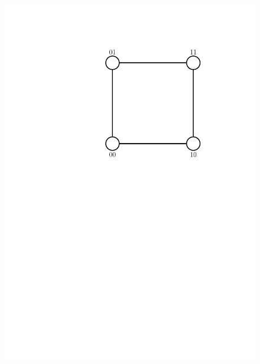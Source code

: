 \begin{figure}[htb]
{	\includegraphics[scale=.4]{01_graph_theory/pics/2D-cube.pdf}
}
\subfigure[3D-hypercube]{
}
\end{figure}
